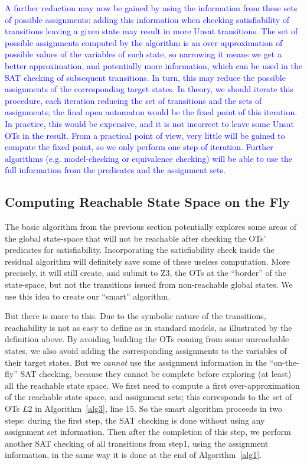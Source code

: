\documentclass[smallcondensed]{svjour3}
\newcommand{\ERIC}[1]{\textcolor{blue}{#1}}
\begin{document}
\ERIC{A further reduction may now be gained by using the information from
these sets of possible assignments: adding this information when
checking satisfiability of transitions leaving a given state may
result in more Unsat transitions. The set of possible
assignments computed by the algorithm is an over approximation of
possible values of the 
variables of such state, so narrowing it means we get a better
approximation, and potentially more information, which can be used in
the SAT checking of subsequent transitions. In turn, this may reduce the possible
assignments of the corresponding target states. In theory, we should
iterate this procedure, each iteration reducing the set of
transitions and the sets of assignments; the final open automaton
would be the fixed point of this iteration. In practice, this would be
expensive, and it is not incorrect to leave some Unsat OTs in the
result. From a  practical point of view, very little will be gained to compute the
fixed point, so we only perform one step of iteration. Further algorithms 
(e.g. model-checking or equivalence checking) will be able to use the
full information from the predicates and the assignment sets.}

\subsection{Computing Reachable State Space on the Fly}

The basic algorithm from the previous section potentially explores some
areas of the global state-space that will not be reachable after
checking the OTs' predicates for satisfiability. Incorporating the
satisfiability check inside the residual algorithm will definitely
save some of these useless computation. More precisely, it will still
create, and submit to Z3, the OTs at the ``border'' of the state-space, but
not the transitions issued from non-reachable global states. We use
this idea to create our ``smart'' algorithm.

But there is more to this. Due to the symbolic nature of the
  transitions, reachability is not as easy to define as in standard
  models, as illustrated by the definition above. By avoiding building
  the OTs coming from some unreachable states, we also avoid adding
  the corresponding assignments to the variables of their target states.
But we \emph{cannot} use the
assignment information in the ``on-the-fly'' SAT checking, because
they cannot be complete before exploring (at least) all the reachable
state space. We first need to compute a first over-approximation of
the reachable state space, and assignment sets; this corresponds to
the set of OTs $L2$ in Algorithm~\ref{alg3}, line 15.
So the smart algorithm proceeds in two steps: during the
first step, the SAT checking is done without using any assignment set
information. Then after the completion of this step, we perform another
SAT checking of all transitions from step1, using the
assignment information, in the same way it is done at the end of
Algorithm~\ref{alg1}.
\end{document}
